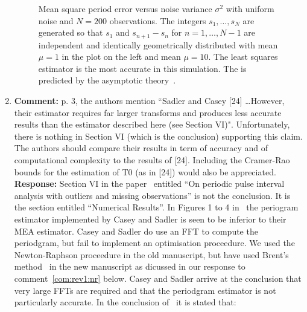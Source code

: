 \documentclass[a4paper,10pt]{article}
\begin{document}
\begin{enumerate}
\begin{figure*}[tp]
  \caption{Mean square period error versus noise variance $\sigma^2$ with uniform noise and $N=200$ observations.  The integers $s_1,\dots,s_N$ are generated so that $s_1$ and $s_{n+1} - s_n$ for $n=1,\dots,N-1$ are independent and identically geometrically distributed with mean $\mu = 1$ in the plot on the left and mean $\mu=10$.  The least squares estimator is the most accurate in this simulation. The is predicted by the asymptotic theory~\cite{Quinn_sparse_noisy_SSP_2012,Quinn20013asilomar_period_est}.}\label{plot:geomuniform}
\end{figure*}


\item\textbf{Comment:}
p. 3, the authors mention “Sadler and Casey [24] \dots However, their estimator
requires far larger transforms and produces less accurate results than the estimator
described here (see Section VI)". Unfortunately, there is nothing in
Section VI (which is the conclusion) supporting this claim. The authors should
compare their results in term of accuracy and of computational complexity to
the results of [24]. Including the Cramer-Rao bounds for the estimation of T0
(as in [24]) would also be appreciated.
\\
\textbf{Response:}
Section VI in the paper~\cite{726812} entitled ``On periodic pulse interval analysis with outliers and missing observations'' is not the conclusion.  It is the section entitled ``Numerical Results''.  In Figures 1 to 4 in~\cite{726812} the periogram estimator implemented by Casey and Sadler is seen to be inferior to their MEA estimator.  Casey and Sadler do use an FFT to compute the periodgram, but fail to implement an optimisation proceedure.  We used the Newton-Raphson proceedure in the old manuscript, but have used Brent's method~\cite{Brent_opt_no_derivs_1973} in the new manuscript as dicussed in our response to comment~\ref{com:rev1:nr} below.  Casey and Sadler arrive at the conclusion that very large FFTs are required and that the periodgram estimator is not particularly accurate.  In the conclusion of~\cite{726812} it is stated that:


\end{enumerate}
\end{document}
